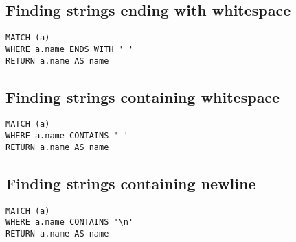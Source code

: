 \subsection{Finding strings ending with whitespace}

\begin{lstlisting}
MATCH (a)
WHERE a.name ENDS WITH ' '
RETURN a.name AS name
\end{lstlisting}

\subsection{Finding strings containing whitespace}

\begin{lstlisting}
MATCH (a)
WHERE a.name CONTAINS ' '
RETURN a.name AS name
\end{lstlisting}

\subsection{Finding strings containing newline}

\begin{lstlisting}
MATCH (a)
WHERE a.name CONTAINS '\n'
RETURN a.name AS name
\end{lstlisting}

